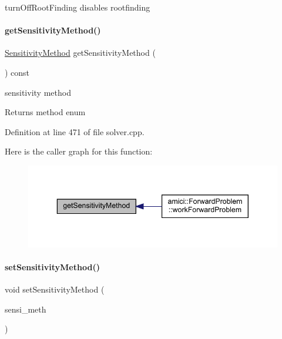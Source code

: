 turn\+Off\+Root\+Finding disables rootfinding \mbox{\label{classamici_1_1_solver_a888cb7142e103c84bdeeb99566aba65a}} 
\paragraph{\texorpdfstring{get\+Sensitivity\+Method()}{getSensitivityMethod()}}
{\footnotesize\ttfamily \mbox{\hyperlink{namespaceamici_aa0fa493529f6872e7e776b91fbbf38f9}{Sensitivity\+Method}} get\+Sensitivity\+Method (\begin{DoxyParamCaption}{ }\end{DoxyParamCaption}) const}

sensitivity method \begin{DoxyReturn}{Returns}
method enum 
\end{DoxyReturn}


Definition at line 471 of file solver.\+cpp.

Here is the caller graph for this function\+:
\nopagebreak
\begin{figure}[H]
\begin{center}
\leavevmode
\includegraphics[width=343pt]{classamici_1_1_solver_a888cb7142e103c84bdeeb99566aba65a_icgraph}
\end{center}
\end{figure}
\mbox{\label{classamici_1_1_solver_a3a7713f2ce77ffade77445a825ad289d}} 
\paragraph{\texorpdfstring{set\+Sensitivity\+Method()}{setSensitivityMethod()}}
{\footnotesize\ttfamily void set\+Sensitivity\+Method (\begin{DoxyParamCaption}\item[{\mbox{\hyperlink{namespaceamici_aa0fa493529f6872e7e776b91fbbf38f9}{Sensitivity\+Method}}}]{sensi\+\_\+meth }\end{DoxyParamCaption})}


